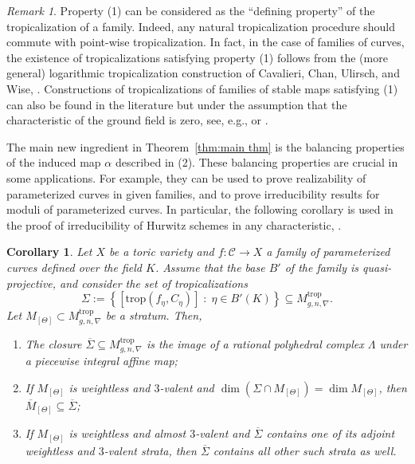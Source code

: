 \documentclass[11pt,reqno]{amsart}
\numberwithin{equation}{section}
\newtheorem{cor}[thm]{Corollary}
\theoremstyle{definition}
\newcommand{\trop}{\mathrm{trop}}
\newcommand{\cC}{{\mathcal{C}}}
\theoremstyle{remark}
\newtheorem{rem}[thm]{Remark}
\begin{document}
\begin{rem}\label{rem:ref}
    Property (1) can be considered as the ``defining property'' of the tropicalization of a family. Indeed, any natural tropicalization procedure should commute with point-wise tropicalization. In fact, in the case of families of curves, the existence of tropicalizations satisfying property (1) follows from the (more general) logarithmic tropicalization construction of Cavalieri, Chan, Ulirsch, and Wise, \cite[\S~7.1-7.3]{CCUW}. Constructions of tropicalizations of families of stable maps satisfying (1) can also be found in the literature but under the assumption that the characteristic of the ground field is zero, see, e.g., \cite{ACGS} or \cite{R17, Ran22}. 
    
    The main new ingredient in Theorem~\ref{thm:main thm} is the balancing properties of the induced map $\alpha$ described in (2). These balancing properties are crucial in some applications. For example, they can be used to prove realizability of parameterized curves in given families, and to prove irreducibility results for moduli of parameterized curves. In particular, the following corollary is used in the proof of irreducibility of Hurwitz schemes in any characteristic, \cite{CHT24b}.
\end{rem}

\begin{cor} \label{cor:main}
Let $X$ be a toric variety and $f\colon \cC \rightarrow X$ a family of parameterized curves defined over the field $K$. Assume that the base $B'$ of the family is quasi-projective, and consider the set of tropicalizations
$$\Sigma:=\left\{\left[ \trop(f_\eta, C_\eta)\right]\; :\; \eta\in B'(K) \right\}\subseteq M^{\trop}_{g,n,\nabla}.$$
Let $M_{[\Theta]}\subset M^{\trop}_{g,n,\nabla}$ be a stratum. Then,
\begin{enumerate}
\item The closure $\overline\Sigma\subseteq M^{\trop}_{g,n,\nabla}$ is the image of a rational polyhedral complex $\Lambda$ under a piecewise integral affine map;
\item If $M_{[\Theta]}$ is weightless and $3$-valent and $\dim(\Sigma\cap M_{[\Theta]})=\dim M_{[\Theta]}$, then $\overline M_{[\Theta]}\subseteq \overline{\Sigma}$;
\item If $M_{[\Theta]}$ is weightless and almost $3$-valent and $\overline{\Sigma}$ contains one of its adjoint weightless and $3$-valent strata, then $\overline{\Sigma}$ contains all other such strata as well. 
\end{enumerate}
\end{cor}
\end{document}
